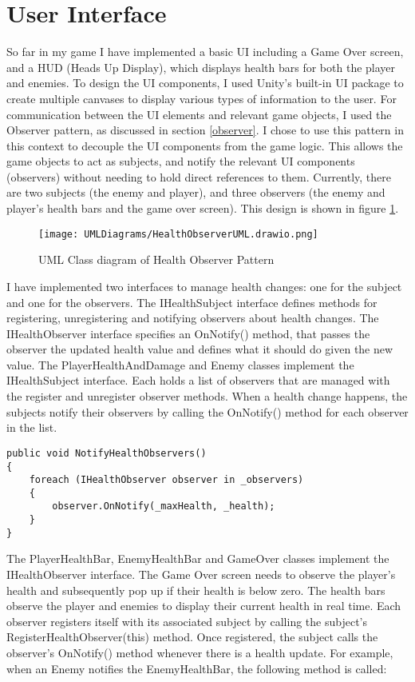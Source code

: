 \documentclass[]{final_report}
\begin{document}
\section{User Interface}
So far in my game I have implemented a basic UI including a Game Over screen, and a HUD (Heads Up Display), which displays health bars for both the player and enemies. To design the UI components, I used Unity's built-in UI package \cite{unity2024_UI} to create multiple canvases to display various types of information to the user. For communication between the UI elements and relevant game objects, I used the Observer pattern, as discussed in section \ref{observer}. I chose to use this pattern in this context to decouple the UI components from the game logic. This allows the game objects to act as subjects, and notify the relevant UI components (observers) without needing to hold direct references to them. Currently, there are two subjects (the enemy and player), and three observers (the enemy and player's health bars and the game over screen). This design is shown in figure \ref{fig:label_observer1}.
\begin{figure}[H]
    \centering
    \texttt{[image: UMLDiagrams/HealthObserverUML.drawio.png]}
    \caption{UML Class diagram of Health Observer Pattern}
    \label{fig:label_observer1}
\end{figure}
I have implemented two interfaces to manage health changes: one for the subject and one for the observers. The IHealthSubject interface defines methods for registering, unregistering and notifying observers about health changes. The IHealthObserver interface specifies an OnNotify() method, that passes the observer the updated health value and defines what it should do given the new value. 
The PlayerHealthAndDamage and Enemy classes implement the IHealthSubject interface. Each holds a list of observers that are managed with the register and unregister observer methods. When a health change happens, the subjects notify their observers by calling the OnNotify() method for each observer in the list.  
\begin{verbatim}
public void NotifyHealthObservers()
{
    foreach (IHealthObserver observer in _observers)
    {
        observer.OnNotify(_maxHealth, _health);
    }
}
\end{verbatim}
The PlayerHealthBar, EnemyHealthBar and GameOver classes implement the IHealthObserver interface. The Game Over screen needs to observe the player's health and subsequently pop up if their health is below zero. 
The health bars observe the player and enemies to display their current health in real time. Each observer registers itself with its associated subject by calling the subject's RegisterHealthObserver(this) method. Once registered, the subject calls the observer's OnNotify() method whenever there is a health update. For example, when an Enemy notifies the EnemyHealthBar, the following method is called:
\end{document}
